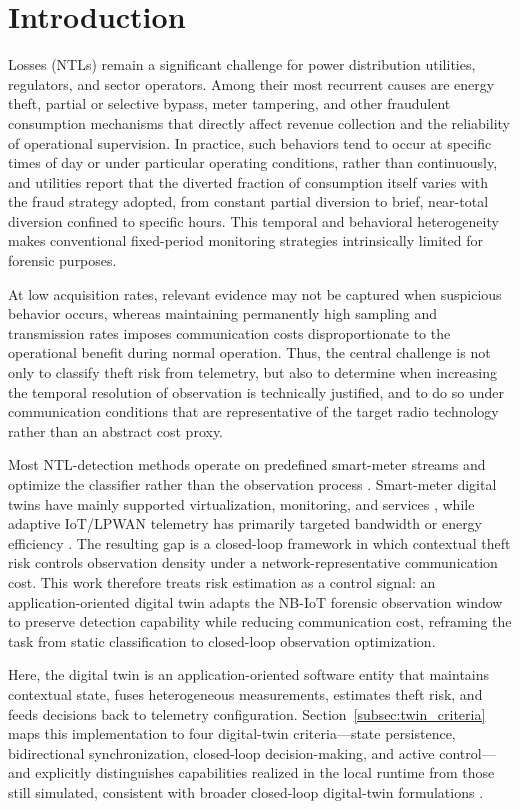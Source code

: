 \documentclass{ieeeaccess}
\begin{document}
\section{Introduction}
\label{sec:introduction}
 Losses (NTLs) remain a significant challenge for power distribution utilities, regulators, and sector operators. Among their most recurrent causes are energy theft, partial or selective bypass, meter tampering, and other fraudulent consumption mechanisms that directly affect revenue collection and the reliability of operational supervision. In practice, such behaviors tend to occur at specific times of day or under particular operating conditions, rather than continuously, and utilities report that the diverted fraction of consumption itself varies with the fraud strategy adopted, from constant partial diversion to brief, near-total diversion confined to specific hours. This temporal and behavioral heterogeneity makes conventional fixed-period monitoring strategies intrinsically limited for forensic purposes.

At low acquisition rates, relevant evidence may not be captured when suspicious behavior occurs, whereas maintaining permanently high sampling and transmission rates imposes communication costs disproportionate to the operational benefit during normal operation. Thus, the central challenge is not only to classify theft risk from telemetry, but also to determine when increasing the temporal resolution of observation is technically justified, and to do so under communication conditions that are representative of the target radio technology rather than an abstract cost proxy.

Most NTL-detection methods operate on predefined smart-meter streams and optimize the classifier rather than the observation process \cite{b2,b4,b5,b6}. Smart-meter digital twins have mainly supported virtualization, monitoring, and services \cite{b19,b20,b22}, while adaptive IoT/LPWAN telemetry has primarily targeted bandwidth or energy efficiency \cite{b26,b27,b29}. The resulting gap is a closed-loop framework in which contextual theft risk controls observation density under a network-representative communication cost. This work therefore treats risk estimation as a control signal: an application-oriented digital twin adapts the NB-IoT forensic observation window to preserve detection capability while reducing communication cost, reframing the task from static classification to closed-loop observation optimization.

Here, the digital twin is an application-oriented software entity that maintains contextual state, fuses heterogeneous measurements, estimates theft risk, and feeds decisions back to telemetry configuration. Section~\ref{subsec:twin_criteria} maps this implementation to four digital-twin criteria---state persistence, bidirectional synchronization, closed-loop decision-making, and active control---and explicitly distinguishes capabilities realized in the local runtime from those still simulated, consistent with broader closed-loop digital-twin formulations \cite{b15,b16,b24}.
\end{document}
